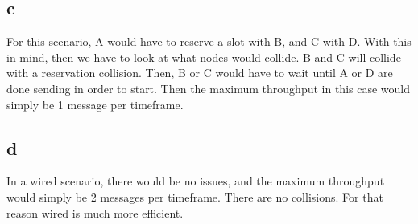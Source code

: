 \documentclass[10pt,letterpaper]{article}
\begin{document}
\subsection*{c}
For this scenario, A would have to reserve a slot with B, and C with D. With
this in mind, then we have to look at what nodes would collide. B and C will
collide with a reservation collision. Then, B or C would have to wait until 
A or D are done sending in order to start. Then the maximum throughput in this
case would simply be 1 message per timeframe.

\subsection*{d}
In a wired scenario, there would be no issues, and the maximum throughput would
simply be 2 messages per timeframe. There are no collisions. For that reason
wired is much more efficient.
\end{document}
